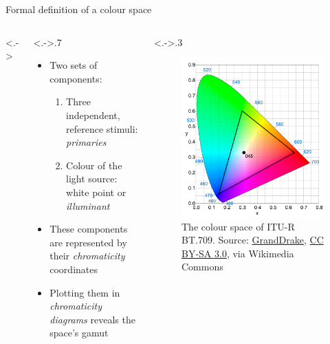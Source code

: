 \documentclass[aspectratio=169,handout,usepdftitle=false]{fireshonks}
\begin{document}
\begin{frame}{Formal definition of a colour space}
    \begin{columns}<.->
        \begin{column}<.->{.7\textwidth}
            \begin{itemize}
                \item Two sets of components:
                      \begin{enumerate}
                          \item Three independent, reference stimuli: \emph{primaries}
                          \item Colour of the light source: white point or \emph{illuminant}
                      \end{enumerate}
                \item These components are represented by their \emph{chromaticity} coordinates
                \item Plotting them in \emph{chromaticity diagrams} reveals the space's gamut
            \end{itemize}
        \end{column}
        \begin{column}<.->{.3\textwidth}
            \begin{figure}
                \includegraphics[width=\columnwidth,keepaspectratio]{figures/bt709.pdf}
                \caption*{The colour space of ITU-R BT.709. Source: \href{https://commons.wikimedia.org/wiki/File:CIExy1931_Rec_709.svg}{GrandDrake}, \href{http://creativecommons.org/licenses/by-sa/3.0/}{CC BY-SA 3.0}, via Wikimedia Commons}
            \end{figure}
        \end{column}
    \end{columns}
\end{frame}
\end{document}

